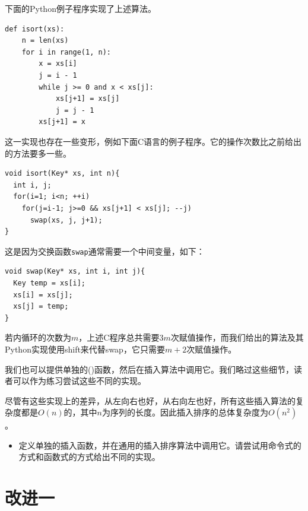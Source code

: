 \documentclass[UTF8]{article}
\begin{document}
下面的Python例子程序实现了上述算法。

\lstset{language=Python}
\begin{lstlisting}
def isort(xs):
    n = len(xs)
    for i in range(1, n):
        x = xs[i]
        j = i - 1
        while j >= 0 and x < xs[j]:
            xs[j+1] = xs[j]
            j = j - 1
        xs[j+1] = x
\end{lstlisting}

这一实现也存在一些变形，例如下面C语言的例子程序。它的操作次数比之前给出的方法要多一些。

\lstset{language=C}
\begin{lstlisting}
void isort(Key* xs, int n){
  int i, j;
  for(i=1; i<n; ++i)
    for(j=i-1; j>=0 && xs[j+1] < xs[j]; --j)
      swap(xs, j, j+1);
}
\end{lstlisting}

这是因为交换函数\texttt{swap}通常需要一个中间变量，如下：

\begin{lstlisting}
void swap(Key* xs, int i, int j){
  Key temp = xs[i];
  xs[i] = xs[j];
  xs[j] = temp;
}
\end{lstlisting}

若内循环的次数为$m$，上述C程序总共需要$3m$次赋值操作，而我们给出的算法及其Python实现使用shift来代替swap，它只需要$m+2$次赋值操作。

我们也可以提供单独的()函数，然后在插入算法中调用它。我们略过这些细节，读者可以作为练习尝试这些不同的实现。

尽管有这些实现上的差异，从左向右也好，从右向左也好，所有这些插入算法的复杂度都是$O(n)$的，其中$n$为序列的长度。因此插入排序的总体复杂度为$O(n^2)$。

\begin{Exercise}

\begin{itemize}
\item 定义单独的插入函数，并在通用的插入排序算法中调用它。请尝试用命令式的方式和函数式的方式给出不同的实现。
\end{itemize}

\end{Exercise}


\section{改进一}
\end{document}

